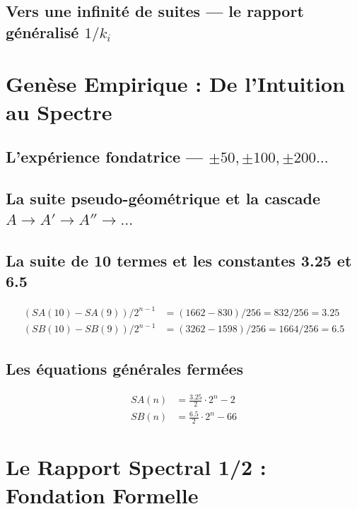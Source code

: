 \documentclass[11pt,a4paper]{article}
\begin{document}
\subsection{Vers une infinité de suites --- le rapport généralisé $1/k_i$}

\section{Genèse Empirique : De l'Intuition au Spectre}

\subsection{L'expérience fondatrice --- $\pm 50, \pm 100, \pm 200\ldots$}
\subsection{La suite pseudo-géométrique et la cascade $A \to A' \to A'' \to \ldots$}
\subsection{La suite de 10 termes et les constantes 3.25 et 6.5}

\begin{align}
(SA(10) - SA(9))/2^{n-1} &= (1662 - 830)/256 = 832/256 = 3.25 \\
(SB(10) - SB(9))/2^{n-1} &= (3262 - 1598)/256 = 1664/256 = 6.5
\end{align}

\subsection{Les équations générales fermées}
\begin{align}
SA(n) &= \frac{3.25}{2} \cdot 2^n - 2 \\
SB(n) &= \frac{6.5}{2}  \cdot 2^n - 66
\end{align}

\section{Le Rapport Spectral 1/2 : Fondation Formelle}
\end{document}
